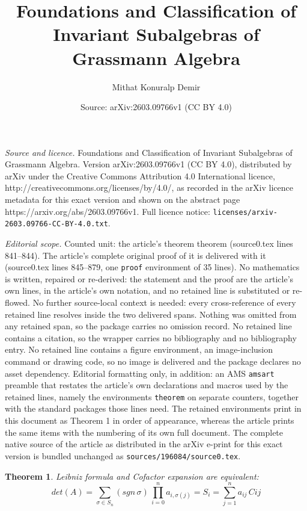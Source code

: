 \documentclass[10pt,a4paper]{amsart}
\title{Foundations and Classification of Invariant Subalgebras of Grassmann Algebra}
\author{Mithat Konuralp Demir}
\date{Source: arXiv:2603.09766v1 (CC BY 4.0)}
\newtheorem{theorem}{Theorem}
\begin{document}
\maketitle

\noindent\emph{Source and licence.} Foundations and Classification of Invariant Subalgebras of Grassmann Algebra. Version arXiv:2603.09766v1 (CC BY 4.0), distributed by arXiv under the Creative Commons Attribution 4.0 International licence, http://creativecommons.org/licenses/by/4.0/, as recorded in the arXiv licence metadata for this exact version and shown on the abstract page https://arxiv.org/abs/2603.09766v1. Full licence notice: \texttt{licenses/arxiv-2603.09766-CC-BY-4.0.txt}.\par\smallskip

\noindent\textit{Editorial scope.} Counted unit: the article's theorem theorem (source0.tex lines 841--844). The article's complete original proof of it is delivered with it (source0.tex lines 845--879, one \texttt{proof} environment of 35 lines). No mathematics is written, repaired or re-derived: the statement and the proof are the article's own lines, in the article's own notation, and no retained line is substituted or re-flowed.  No further source-local context is needed: every cross-reference of every retained line resolves inside the two delivered spans.  Nothing was omitted from any retained span, so the package carries no omission record.  No retained line contains a citation, so the wrapper carries no bibliography and no bibliography entry.  No retained line contains a figure environment, an image-inclusion command or drawing code, so no image is delivered and the package declares no asset dependency.  Editorial formatting only, in addition: an AMS \texttt{amsart} preamble that restates the article's own declarations and macros used by the retained lines, namely the environments \texttt{theorem} on separate counters, together with the standard packages those lines need.  The retained environments print in this document as Theorem 1 in order of appearance, whereas the article prints the same items with the numbering of its own full document.  The complete native source of the article as distributed in the arXiv e-print for this exact version is bundled unchanged as \texttt{sources/196084/source0.tex}.
\begin{theorem}
    Leibniz formula and Cofactor expansion are equivalent:
    $$det(A) = \sum_{\sigma \in S_n}(sgn \,\sigma)\,\prod_{i = 0}^na_{i, \sigma(j)} = S_i = \sum_{j = 1}^n a_{ij}\,C{ij}$$ 
\end{theorem}
\end{document}
